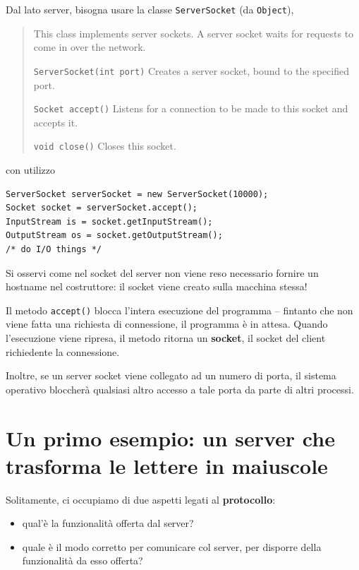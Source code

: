 \documentclass[\fontsizeclass,twocolumn]{\classname}
\theoremstyle{definition}
\theoremstyle{definition}
\begin{document}
Dal lato server, bisogna usare la classe \texttt{ServerSocket} (da \texttt{Object}),

\begin{quote}
    \footnotesize{This class implements server sockets. A server socket waits for requests to come in over the network.

        \texttt{ServerSocket(int port)} 	Creates a server socket, bound to the specified port.

\texttt{Socket 	accept()} 	Listens for a connection to be made to this socket and accepts it.

    \texttt{void 	close()} 	Closes this socket.

}
\end{quote}

con utilizzo

\begin{lstlisting}
ServerSocket serverSocket = new ServerSocket(10000);
Socket socket = serverSocket.accept();
InputStream is = socket.getInputStream();
OutputStream os = socket.getOutputStream();
/* do I/O things */
\end{lstlisting}

Si osservi come nel socket del server non viene reso necessario fornire un
hostname nel costruttore: il socket viene creato sulla macchina stessa!

Il metodo \texttt{ac\-cept()} blocca l'intera esecuzione del programma --
fintanto che non viene fatta una richiesta di connessione, il programma è in
attesa. Quando l'esecuzione viene ripresa, il metodo ritorna un
\textbf{socket}, il socket del client richiedente la connessione.

Inoltre, se un server socket viene collegato ad un numero di porta, il sistema
operativo bloccherà qualsiasi altro accesso a tale porta da parte di altri
processi.

\section{Un primo esempio: un server che trasforma le lettere in maiuscole}

Solitamente, ci occupiamo di due aspetti legati al \textbf{protocollo}:
\begin{itemize}
    \item qual'è la funzionalità offerta dal server?
    \item quale è il modo corretto per comunicare col server, per disporre
        della funzionalità da esso offerta?
\end{itemize}
\end{document}
